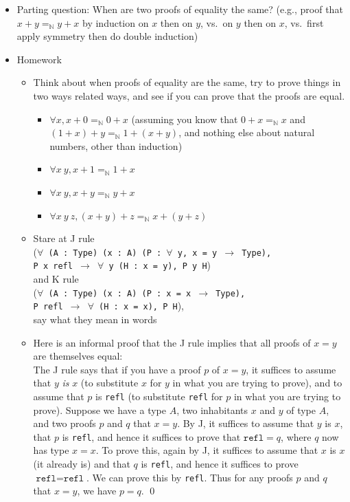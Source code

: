 \documentclass{article}
\begin{document}
\begin{itemize}
  \item Parting question: When are two proofs of equality the same? (e.g., proof that $x + y =_{\mathbb{N}} y + x$ by induction on $x$ then on $y$, vs.~on $y$ then on $x$, vs.~first apply symmetry then do double induction)
  \item Homework
    \begin{itemize}
      \item Think about when proofs of equality are the same, try to prove things in two ways related ways, and see if you can prove that the proofs are equal.
      \begin{itemize}
        \item $\forall x, x + 0 =_{\mathbb{N}} 0 + x$ (assuming you know that $0 + x =_{\mathbb{N}} x$ and $(1 + x) + y =_{\mathbb{N}} 1 + (x + y)$, and nothing else about natural numbers, other than induction)
        \item $\forall x\ y, x + 1 =_{\mathbb{N}} 1 + x$
        \item $\forall x\ y, x + y =_{\mathbb{N}} y + x$
        \item $\forall x\ y\ z, (x + y) + z =_{\mathbb{N}} x + (y + z)$
      \end{itemize}
      \item Stare at J rule \\
        (\texttt{$\forall$~(A~:~Type) (x~:~A) (P~:~$\forall$ y, x = y $\to$ Type), \\ P x refl $\to$ $\forall$~y (H~:~x = y), P y H}) \\
        and K rule \\
        (\texttt{$\forall$~(A~:~Type) (x~:~A) (P~:~x = x $\to$ Type), \\ P refl $\to$ $\forall$~(H~:~x~=~x), P H}), \\
        say what they mean in words
      \item
        Here is an informal proof that the J rule implies that all proofs of $x = y$ are themselves equal: \\
        The J rule says that if you have a proof $p$ of $x = y$, it suffices to assume that $y$ \emph{is} $x$ (to substitute $x$ for $y$ in what you are trying to prove), and to assume that $p$ is \texttt{refl} (to substitute \texttt{refl} for $p$ in what you are trying to prove).  Suppose we have a type $A$, two inhabitants $x$ and $y$ of type $A$, and two proofs $p$ and $q$ that $x = y$.  By J, it suffices to assume that $y$ is $x$, that $p$ is \texttt{refl}, and hence it suffices to prove that $\texttt{refl} = q$, where $q$ now has type $x = x$.  To prove this, again by J, it suffices to assume that $x$ is $x$ (it already is) and that $q$ is \texttt{refl}, and hence it suffices to prove $\texttt{refl} = \texttt{refl}$.  We can prove this by \texttt{refl}.  Thus for any proofs $p$ and $q$ that $x = y$, we have $p = q$. \qed \\

\end{itemize}
\end{itemize}
\end{document}
